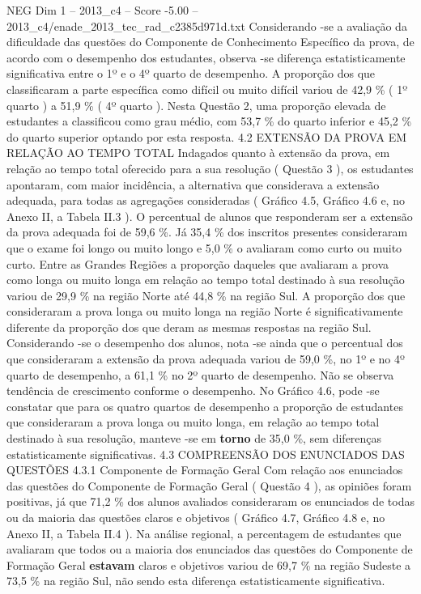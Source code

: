 \begin{textsample}{NEG Dim 1 – 2013\_c4 – Score -5.00 – 2013\_c4/enade\_2013\_tec\_rad\_c2385d971d.txt}
Considerando -se a avaliação da dificuldade das questões do Componente de Conhecimento Específico da prova, de acordo com o desempenho dos estudantes, observa -se diferença estatisticamente significativa entre o 1º e o 4º quarto de desempenho.
A proporção dos que classificaram a parte específica como difícil ou muito difícil variou de 42,9 \% ( 1º quarto ) a 51,9 \% ( 4º quarto ).
Nesta Questão 2, uma proporção elevada de estudantes a classificou como grau médio, com 53,7 \% do quarto inferior e 45,2 \% do quarto superior optando por esta resposta. 4.2 EXTENSÃO DA PROVA EM RELAÇÃO AO TEMPO TOTAL Indagados quanto à extensão da prova, em relação ao tempo total oferecido para a sua resolução ( Questão 3 ), os estudantes apontaram, com maior incidência, a alternativa que considerava a extensão adequada, para todas as agregações consideradas ( Gráfico 4.5, Gráfico 4.6 e, no Anexo II, a Tabela II.3 ).
O percentual de alunos que responderam ser a extensão da prova adequada foi de 59,6 \%.
Já 35,4 \% dos inscritos presentes consideraram que o exame foi longo ou muito longo e 5,0 \% o avaliaram como curto ou muito curto.
Entre as Grandes Regiões a proporção daqueles que avaliaram a prova como longa ou muito longa em relação ao tempo total destinado à sua resolução variou de 29,9 \% na região Norte até 44,8 \% na região Sul.
A proporção dos que consideraram a prova longa ou muito longa na região Norte é significativamente diferente da proporção dos que deram as mesmas respostas na região Sul.
Considerando -se o desempenho dos alunos, nota -se ainda que o percentual dos que consideraram a extensão da prova adequada variou de 59,0 \%, no 1º e no 4º quarto de desempenho, a 61,1 \% no 2º quarto de desempenho.
Não se observa tendência de crescimento conforme o desempenho.
No Gráfico 4.6, pode -se constatar que para os quatro quartos de desempenho a proporção de estudantes que consideraram a prova longa ou muito longa, em relação ao tempo total destinado à sua resolução, manteve -se em \textbf{torno} de 35,0 \%, sem diferenças estatisticamente significativas. 4.3 COMPREENSÃO DOS ENUNCIADOS DAS QUESTÕES 4.3.1 Componente de Formação Geral Com relação aos enunciados das questões do Componente de Formação Geral ( Questão 4 ), as opiniões foram positivas, já que 71,2 \% dos alunos avaliados consideraram os enunciados de todas ou da maioria das questões claros e objetivos ( Gráfico 4.7, Gráfico 4.8 e, no Anexo II, a Tabela II.4 ).
Na análise regional, a percentagem de estudantes que avaliaram que todos ou a maioria dos enunciados das questões do Componente de Formação Geral \textbf{estavam} claros e objetivos variou de 69,7 \% na região Sudeste a 73,5 \% na região Sul, não sendo esta diferença estatisticamente significativa.

\end{textsample}
